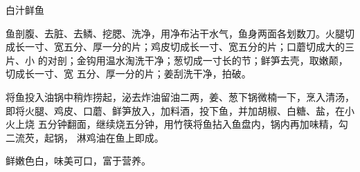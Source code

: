 \begin{recipe}{白汁鲜鱼}

\ingredients


\preparation

\step 鱼剖腹、去脏、去鳞、挖腮、洗净，用净布沾干水气，鱼身两面各划数刀。火腿切
成长一寸、宽五分、厚一分的片；鸡皮切成长一寸、宽五分的片；口蘑切成大的三片、小
的对剖；金钩用温水淘洗干净；葱切成一寸长的节；鲜笋去壳，取嫩颠，切成长一寸、宽
五分、厚一分的片；姜刮洗干净，拍破。

\step 将鱼投入油锅中稍炸捞起，泌去炸油留油二两，姜、葱下锅微楠一下，烹入清汤，
即将火腿、鸡皮、口蘑、鲜笋放入，加料酒，投下鱼，并加胡椒、白糖、盐，在小火上烧
五分钟翻面，继续烧五分钟，用竹筷将鱼拈入鱼盘内，锅内再加味精，勾二流芡，起锅，
淋鸡油在鱼上即成。

\features

鲜嫩色白，味美可口，富于营养。

\end{recipe}

